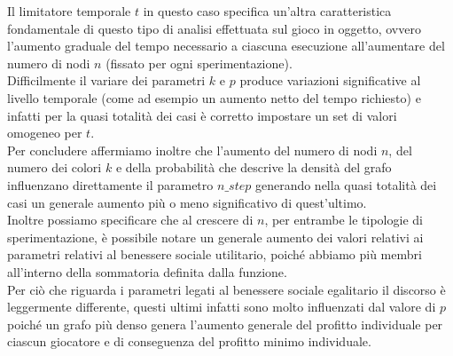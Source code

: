 Il limitatore temporale $t$ in questo caso specifica un'altra caratteristica fondamentale di questo tipo di analisi effettuata sul gioco in oggetto, ovvero l'aumento graduale del tempo necessario a ciascuna esecuzione all'aumentare del numero di nodi $n$ (fissato per ogni sperimentazione).\\
Difficilmente il variare dei parametri $k$ e $p$ produce variazioni significative al livello temporale (come ad esempio un aumento netto del tempo richiesto) e infatti per la quasi totalità dei casi è corretto impostare un set di valori omogeneo per $t$.\\

Per concludere affermiamo inoltre che l'aumento del numero di nodi $n$, del numero dei colori $k$ e della probabilità che descrive la densità del grafo influenzano direttamente il parametro $n\_step$ generando nella quasi totalità dei casi un generale aumento più o meno significativo di quest'ultimo.\\
Inoltre possiamo specificare che al crescere di $n$, per entrambe le tipologie di sperimentazione, è possibile notare un generale aumento dei valori relativi ai parametri relativi al benessere sociale utilitario, poiché abbiamo più membri all'interno della sommatoria definita dalla funzione.\\
Per ciò che riguarda i parametri legati al benessere sociale egalitario il discorso è leggermente differente, questi ultimi infatti sono molto influenzati dal valore di $p$ poiché un grafo più denso genera l'aumento generale del profitto individuale per ciascun giocatore e di conseguenza del profitto minimo individuale.\\ 
